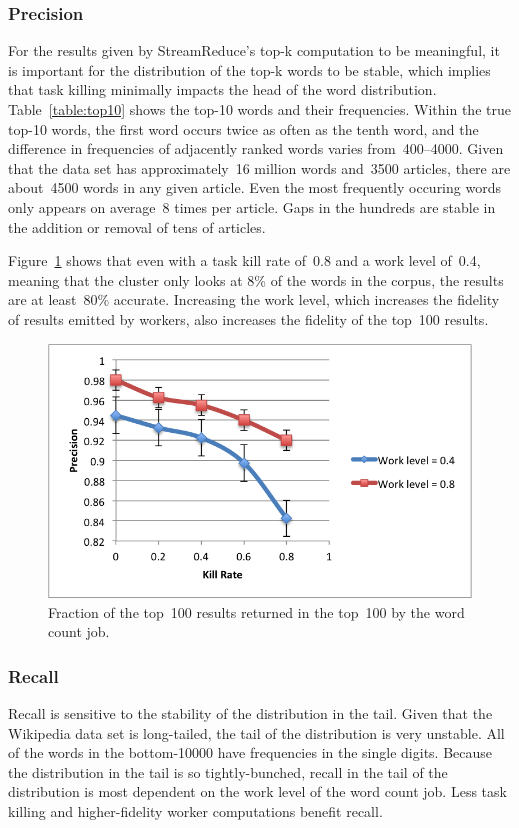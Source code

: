 \documentclass[12pt,twocolumn]{article}
\begin{document}
\subsubsection{Precision}
For the results given by StreamReduce's top-k computation to be meaningful,
it is important for the distribution of the top-k words to be stable, which implies
that task killing minimally impacts the head of the word distribution.
Table~\ref{table:top10} shows the top-10 words and their frequencies. Within the true top-10
words, the first word occurs twice as often as the tenth word, and the difference in frequencies
of adjacently ranked words varies from~400--4000. Given that the data set has approximately~16 million
words and~3500 articles, there are about~4500 words in any given article. Even the most frequently
occuring words only appears on average~8 times per article. Gaps in the hundreds are stable in the
addition or removal of tens of articles.

Figure~\ref{fig:precision} shows that even with a task kill rate of~0.8 and a work level of~0.4,
meaning that the cluster only looks at 8\% of the words in the corpus, the results
are at least~80\% accurate. Increasing the work level, which increases the fidelity of
results emitted by workers, also increases the fidelity of the top~100 results.

\begin{figure}
\includegraphics[width=\linewidth]{top-100-precision.png}
\caption{Fraction of the top~100 results returned in the top~100 by the word count job.}
\label{fig:precision}
\end{figure}

\subsubsection{Recall}
Recall is sensitive to the stability of the distribution in the tail. Given that the Wikipedia
data set is long-tailed, the tail of the distribution is very unstable. All of the words
in the bottom-10000 have frequencies in the single digits. Because the distribution in the
tail is so tightly-bunched, recall in the tail of the distribution is most dependent on the
work level of the word count job. Less task killing and higher-fidelity worker computations
benefit recall.
\end{document}
